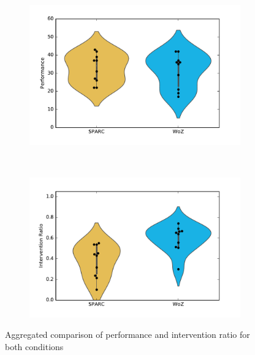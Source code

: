 \begin{figure}[t!]
	\centering
	\begin{subfigure}[t]{0.5\textwidth}
		\centering
		\includegraphics[width=1.0\textwidth]{./images/woz_perf.pdf}
	\end{subfigure}%
	~ 
	\begin{subfigure}[t]{0.5\textwidth}
		\centering
		\includegraphics[width=1.0\textwidth]{./images/woz_ratio.pdf}
	\end{subfigure}
	\caption{Aggregated comparison of performance and intervention ratio for both conditions}
	\label{fig:woz_comp}
\end{figure}


